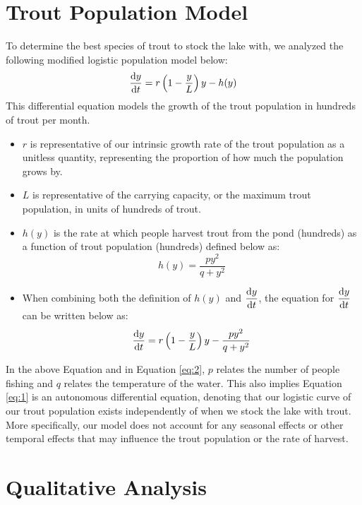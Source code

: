 \documentclass[letterpaper,12pt]{article}
\begin{document}
\section{Trout Population Model}
To determine the best species of trout to stock the lake with, we analyzed the following modified logistic population model below:
\begin{equation} \label{eq:1}
    \dv{y}{t} = r\left(1 - \frac{y}{L}\right)y - h(y)
\end{equation}
This differential equation models the growth of the trout population in hundreds of trout per month. 
\begin{itemize}
    \item \(r\) is representative of our intrinsic growth rate of the trout population as a unitless quantity, representing the proportion of how much the population grows by.
    \item \(L\) is representative of the carrying capacity, or the maximum trout population, in units of hundreds of trout.
    \item \(h(y)\) is the rate at which people harvest trout from the pond (hundreds) as a function of trout population (hundreds) defined below as:
\begin{equation} \label{eq:2}
    h(y) = \frac{py^2}{q + y^2}
\end{equation}
    \item When combining both the definition of \(h(y)\) and \(\displaystyle \dv{y}{t}\), the equation for \(\displaystyle \dv{y}{t}\) can be written below as:
\begin{equation*}
    \dv{y}{t} = r\left(1 - \frac{y}{L}\right)y - \frac{py^2}{q + y^2}
\end{equation*}
\end{itemize}
In the above Equation and in Equation \eqref{eq:2}, \(p\) relates the number of people fishing and \(q\) relates the temperature of the water.
This also implies Equation \eqref{eq:1} is an autonomous differential equation, denoting that our logistic curve of our trout population exists independently of when we stock the lake with trout. 
More specifically, our model does not account for any seasonal effects or other temporal effects that may influence the trout population or the rate of harvest.
\section{Qualitative Analysis}
\end{document}

